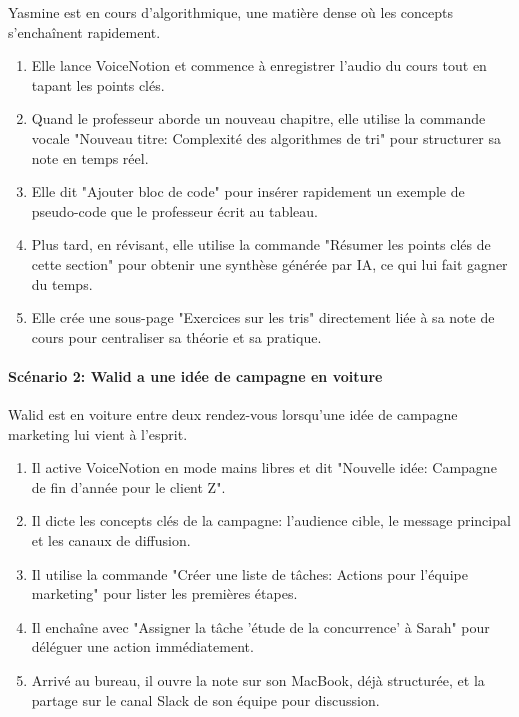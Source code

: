     Yasmine est en cours d'algorithmique, une matière dense où les concepts s'enchaînent rapidement.
    \begin{enumerate}
        \item Elle lance VoiceNotion et commence à enregistrer l'audio du cours tout en tapant les points clés.
        \item Quand le professeur aborde un nouveau chapitre, elle utilise la commande vocale "Nouveau titre: Complexité des algorithmes de tri" pour structurer sa note en temps réel.
        \item Elle dit "Ajouter bloc de code" pour insérer rapidement un exemple de pseudo-code que le professeur écrit au tableau.
        \item Plus tard, en révisant, elle utilise la commande "Résumer les points clés de cette section" pour obtenir une synthèse générée par IA, ce qui lui fait gagner du temps.
        \item Elle crée une sous-page "Exercices sur les tris" directement liée à sa note de cours pour centraliser sa théorie et sa pratique.
    \end{enumerate}
    
    \paragraph{Scénario 2: Walid a une idée de campagne en voiture}
    
    Walid est en voiture entre deux rendez-vous lorsqu'une idée de campagne marketing lui vient à l'esprit.
    \begin{enumerate}
        \item Il active VoiceNotion en mode mains libres et dit "Nouvelle idée: Campagne de fin d'année pour le client Z".
        \item Il dicte les concepts clés de la campagne: l'audience cible, le message principal et les canaux de diffusion.
        \item Il utilise la commande "Créer une liste de tâches: Actions pour l'équipe marketing" pour lister les premières étapes.
        \item Il enchaîne avec "Assigner la tâche 'étude de la concurrence' à Sarah" pour déléguer une action immédiatement.
        \item Arrivé au bureau, il ouvre la note sur son MacBook, déjà structurée, et la partage sur le canal Slack de son équipe pour discussion.
    \end{enumerate}
    

